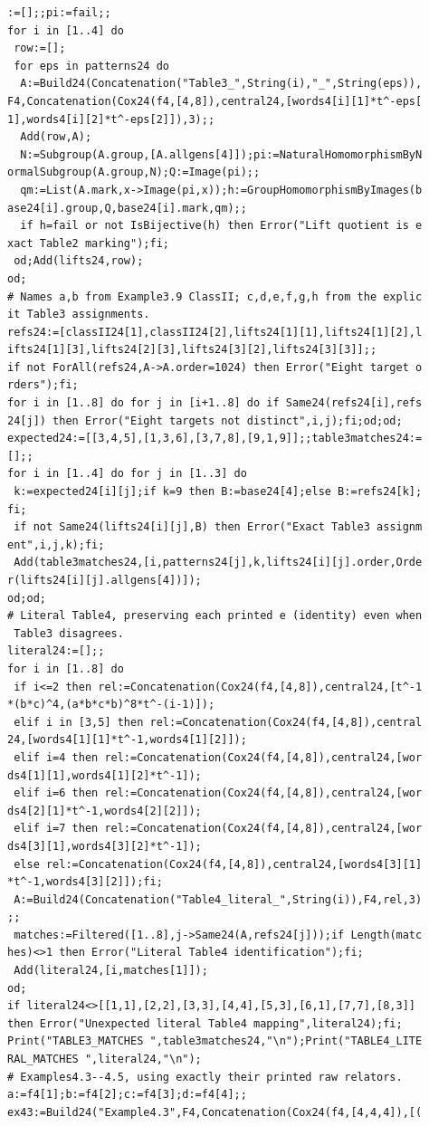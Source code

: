 \documentclass[
  11pt,
  a4paper,
]{article}
\begin{document}
\begin{verbatim}
:=[];;pi:=fail;;
for i in [1..4] do
 row:=[];
 for eps in patterns24 do
  A:=Build24(Concatenation("Table3_",String(i),"_",String(eps)),
F4,Concatenation(Cox24(f4,[4,8]),central24,[words4[i][1]*t^-eps[
1],words4[i][2]*t^-eps[2]]),3);;
  Add(row,A);
  N:=Subgroup(A.group,[A.allgens[4]]);pi:=NaturalHomomorphismByN
ormalSubgroup(A.group,N);Q:=Image(pi);;
  qm:=List(A.mark,x->Image(pi,x));h:=GroupHomomorphismByImages(b
ase24[i].group,Q,base24[i].mark,qm);;
  if h=fail or not IsBijective(h) then Error("Lift quotient is e
xact Table2 marking");fi;
 od;Add(lifts24,row);
od;
# Names a,b from Example3.9 ClassII; c,d,e,f,g,h from the explic
it Table3 assignments.
refs24:=[classII24[1],classII24[2],lifts24[1][1],lifts24[1][2],l
ifts24[1][3],lifts24[2][3],lifts24[3][2],lifts24[3][3]];;
if not ForAll(refs24,A->A.order=1024) then Error("Eight target o
rders");fi;
for i in [1..8] do for j in [i+1..8] do if Same24(refs24[i],refs
24[j]) then Error("Eight targets not distinct",i,j);fi;od;od;
expected24:=[[3,4,5],[1,3,6],[3,7,8],[9,1,9]];;table3matches24:=
[];;
for i in [1..4] do for j in [1..3] do
 k:=expected24[i][j];if k=9 then B:=base24[4];else B:=refs24[k];
fi;
 if not Same24(lifts24[i][j],B) then Error("Exact Table3 assignm
ent",i,j,k);fi;
 Add(table3matches24,[i,patterns24[j],k,lifts24[i][j].order,Orde
r(lifts24[i][j].allgens[4])]);
od;od;
# Literal Table4, preserving each printed e (identity) even when
 Table3 disagrees.
literal24:=[];;
for i in [1..8] do
 if i<=2 then rel:=Concatenation(Cox24(f4,[4,8]),central24,[t^-1
*(b*c)^4,(a*b*c*b)^8*t^-(i-1)]);
 elif i in [3,5] then rel:=Concatenation(Cox24(f4,[4,8]),central
24,[words4[1][1]*t^-1,words4[1][2]]);
 elif i=4 then rel:=Concatenation(Cox24(f4,[4,8]),central24,[wor
ds4[1][1],words4[1][2]*t^-1]);
 elif i=6 then rel:=Concatenation(Cox24(f4,[4,8]),central24,[wor
ds4[2][1]*t^-1,words4[2][2]]);
 elif i=7 then rel:=Concatenation(Cox24(f4,[4,8]),central24,[wor
ds4[3][1],words4[3][2]*t^-1]);
 else rel:=Concatenation(Cox24(f4,[4,8]),central24,[words4[3][1]
*t^-1,words4[3][2]]);fi;
 A:=Build24(Concatenation("Table4_literal_",String(i)),F4,rel,3)
;;
 matches:=Filtered([1..8],j->Same24(A,refs24[j]));if Length(matc
hes)<>1 then Error("Literal Table4 identification");fi;
 Add(literal24,[i,matches[1]]);
od;
if literal24<>[[1,1],[2,2],[3,3],[4,4],[5,3],[6,1],[7,7],[8,3]] 
then Error("Unexpected literal Table4 mapping",literal24);fi;
Print("TABLE3_MATCHES ",table3matches24,"\n");Print("TABLE4_LITE
RAL_MATCHES ",literal24,"\n");
# Examples4.3--4.5, using exactly their printed raw relators.
a:=f4[1];b:=f4[2];c:=f4[3];d:=f4[4];;
ex43:=Build24("Example4.3",F4,Concatenation(Cox24(f4,[4,4,4]),[(

\end{verbatim}
\end{document}
